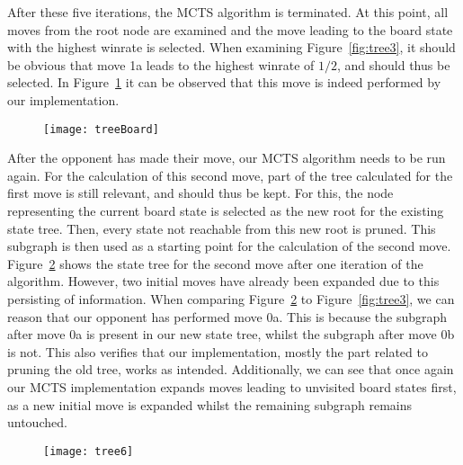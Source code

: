 \documentclass{article}
\begin{document}
After these five iterations, the MCTS algorithm is terminated. At this point, all moves from the root node are examined and the move leading to the board state with the highest winrate is selected. When examining Figure~\ref{fig:tree3}, it should be obvious that move 1a leads to the highest winrate of $1/2$, and should thus be selected. In Figure~\ref{fig:board} it can be observed that this move is indeed performed by our implementation.

\begin{figure}[H]
\centering
\texttt{[image: treeBoard]}
\label{fig:board}
\end{figure}

After the opponent has made their move, our MCTS algorithm needs to be run again. For the calculation of this second move, part of the tree calculated for the first move is still relevant, and should thus be kept. For this, the node representing the current board state is selected as the new root for the existing state tree. Then, every state not reachable from this new root is pruned. This subgraph is then used as a starting point for the calculation of the second move. Figure~\ref{fig:tree4} shows the state tree for the second move after one iteration of the algorithm. However, two initial moves have already been expanded due to this persisting of information. When comparing Figure~\ref{fig:tree4} to Figure~\ref{fig:tree3}, we can reason that our opponent has performed move 0a. This is because the subgraph after move 0a is present in our new state tree, whilst the subgraph after move 0b is not. This also verifies that our implementation, mostly the part related to pruning the old tree, works as intended. Additionally, we can see that once again our MCTS implementation expands moves leading to unvisited board states first, as a new initial move is expanded whilst the remaining subgraph remains untouched.

\begin{figure}[h]
\centering
\texttt{[image: tree6]}
\label{fig:tree4}
\end{figure}

\newpage
\end{document}
